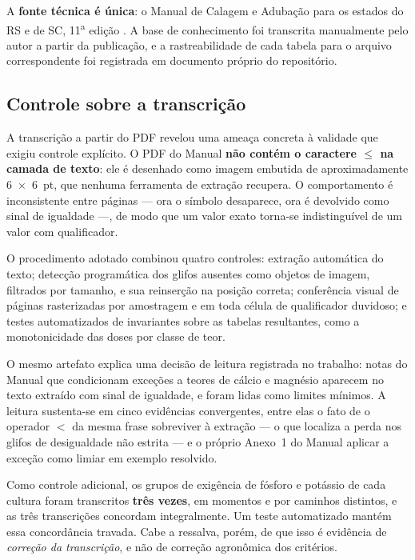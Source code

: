 A \textbf{fonte técnica é única}: o Manual de Calagem e Adubação para os estados do RS e
de SC, 11\textsuperscript{a} edição \citep{ManualCalagem2016}. A base de conhecimento foi
transcrita manualmente pelo autor a partir da publicação, e a rastreabilidade de cada
tabela para o arquivo correspondente foi registrada em documento próprio do repositório.

\subsection{Controle sobre a transcrição}

A transcrição a partir do PDF revelou uma ameaça concreta à validade que exigiu controle
explícito. O PDF do Manual \textbf{não contém o caractere \textquotesingle$\leq$\textquotesingle{} na
camada de texto}: ele é desenhado como imagem embutida de aproximadamente
6~$\times$~6~pt, que nenhuma ferramenta de extração recupera. O comportamento é
inconsistente entre páginas --- ora o símbolo desaparece, ora é devolvido como sinal de
igualdade ---, de modo que um valor exato torna-se indistinguível de um valor com
qualificador.

O procedimento adotado combinou quatro controles: extração automática do texto;
detecção programática dos glifos ausentes como objetos de imagem, filtrados por tamanho,
e sua reinserção na posição correta; conferência visual de páginas rasterizadas por
amostragem e em toda célula de qualificador duvidoso; e testes automatizados de
invariantes sobre as tabelas resultantes, como a monotonicidade das doses por classe de
teor.

O mesmo artefato explica uma decisão de leitura registrada no trabalho: notas do Manual
que condicionam exceções a teores de cálcio e magnésio aparecem no texto extraído com
sinal de igualdade, e foram lidas como limites mínimos. A leitura sustenta-se em cinco
evidências convergentes, entre elas o fato de o operador \textquotesingle$<$\textquotesingle{}
da mesma frase sobreviver à extração --- o que localiza a perda nos glifos de
desigualdade não estrita --- e o próprio Anexo~1 do Manual aplicar a exceção como
limiar em exemplo resolvido.

Como controle adicional, os grupos de exigência de fósforo e potássio de cada cultura
foram transcritos \textbf{três vezes}, em momentos e por caminhos distintos, e as três
transcrições concordam integralmente. Um teste automatizado mantém essa concordância
travada. Cabe a ressalva, porém, de que isso é evidência de \emph{correção da
transcrição}, e não de correção agronômica dos critérios.

